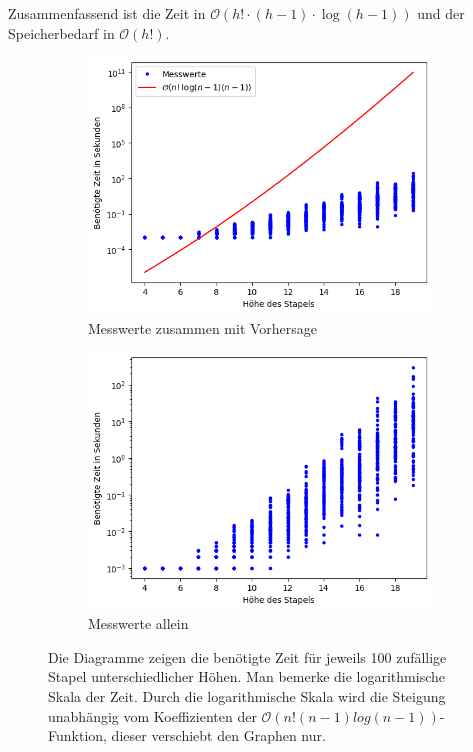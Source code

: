 \documentclass[a4paper,10pt,ngerman]{scrartcl}
\begin{document}
  Zusammenfassend ist die Zeit in $\mathcal{O}(h! \cdot (h-1) \cdot \log (h-1))$ und der Speicherbedarf in $\mathcal{O}(h!)$. \\
  \begin{figure}
    \centering
    \begin{subfigure}{.5\textwidth}
      \centering
      \includegraphics[width=1\linewidth]{zeit-hoehe-bigo.png}
      \caption{Messwerte zusammen mit Vorhersage}
      \label{fig:sub1}
    \end{subfigure}%
    \begin{subfigure}{.5\textwidth}
      \centering
      \includegraphics[width=1\linewidth]{zeit-hoehe.png}
      \caption{Messwerte allein}
      \label{fig:sub2}
    \end{subfigure}
    \caption{Die Diagramme zeigen die benötigte Zeit für jeweils 100 zufällige Stapel unterschiedlicher Höhen. Man bemerke die logarithmische Skala der Zeit. Durch die logarithmische
    Skala wird die Steigung unabhängig vom Koeffizienten der $\mathcal{O}(n!(n-1)log(n-1))$-Funktion, dieser verschiebt den Graphen nur.}
    \label{fig:test}
  \end{figure}
\end{document}
